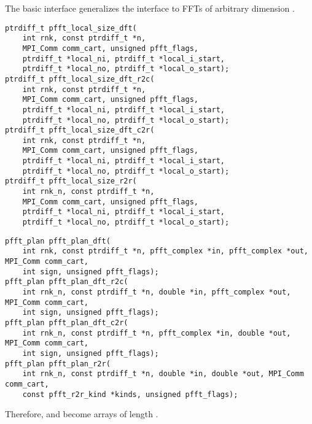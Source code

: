 The basic interface generalizes the  interface to FFTs of arbitrary dimension .
\begin{lstlisting}
ptrdiff_t pfft_local_size_dft(
    int rnk, const ptrdiff_t *n,
    MPI_Comm comm_cart, unsigned pfft_flags,
    ptrdiff_t *local_ni, ptrdiff_t *local_i_start,
    ptrdiff_t *local_no, ptrdiff_t *local_o_start);
ptrdiff_t pfft_local_size_dft_r2c(
    int rnk, const ptrdiff_t *n,
    MPI_Comm comm_cart, unsigned pfft_flags,
    ptrdiff_t *local_ni, ptrdiff_t *local_i_start,
    ptrdiff_t *local_no, ptrdiff_t *local_o_start);
ptrdiff_t pfft_local_size_dft_c2r(
    int rnk, const ptrdiff_t *n,
    MPI_Comm comm_cart, unsigned pfft_flags,
    ptrdiff_t *local_ni, ptrdiff_t *local_i_start,
    ptrdiff_t *local_no, ptrdiff_t *local_o_start);
ptrdiff_t pfft_local_size_r2r(
    int rnk_n, const ptrdiff_t *n,
    MPI_Comm comm_cart, unsigned pfft_flags,
    ptrdiff_t *local_ni, ptrdiff_t *local_i_start,
    ptrdiff_t *local_no, ptrdiff_t *local_o_start);
\end{lstlisting}
\begin{lstlisting}
pfft_plan pfft_plan_dft(
    int rnk, const ptrdiff_t *n, pfft_complex *in, pfft_complex *out, MPI_Comm comm_cart,
    int sign, unsigned pfft_flags);
pfft_plan pfft_plan_dft_r2c(
    int rnk_n, const ptrdiff_t *n, double *in, pfft_complex *out, MPI_Comm comm_cart,
    int sign, unsigned pfft_flags);
pfft_plan pfft_plan_dft_c2r(
    int rnk_n, const ptrdiff_t *n, pfft_complex *in, double *out, MPI_Comm comm_cart,
    int sign, unsigned pfft_flags);
pfft_plan pfft_plan_r2r(
    int rnk_n, const ptrdiff_t *n, double *in, double *out, MPI_Comm comm_cart,
    const pfft_r2r_kind *kinds, unsigned pfft_flags);
\end{lstlisting}
Therefore,  and  become arrays of length .

